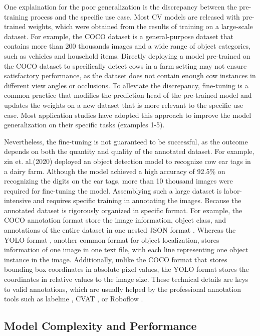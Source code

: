 One explaination for the poor generalization is the discrepancy between the pre-training process and the specific use case. Most CV models are released with pre-trained weights, which were obtained from the results of training on a large-scale dataset. For example, the COCO dataset \citep{} is a general-purpose dataset that contains more than 200 thousands images and a wide range of object categories, such as vehicles and household items. Directly deploying a model pre-trained on the COCO dataset to specifically detect cows in a farm setting may not ensure satisfactory performance, as the dataset does not contain enough cow instances in different view angles or occlusions. To alleviate the discrepancy, fine-tuning is a common practice that modifies the prediction head of the pre-trained model and updates the weights on a new dataset that is more relevant to the specific use case. Most application studies have adopted this approach to improve the model generalization on their specific tasks (examples 1-5).

Nevertheless, the fine-tuning is not guaranteed to be successful, as the outcome depends on both the quantity and quality of the annotated dataset. For example, zin et. al.(2020) deployed an object detection model to recognize cow ear tags in a dairy farm. Although the model achieved a high accuracy of 92.5\% on recognizing the digits on the ear tags, more than 10 thousand images were required for fine-tuning the model. Assemblying such a large dataset is labor-intensive and requires specific training in annotating the images. Because the annotated dataset is rigorously organized in specific format. For example, the COCO annotation format \citep{} store the image information, object class, and annotations of the entire dataset in one nested JSON format \citep{}. Whereas the YOLO format \citep{}, another common format for object localization, stores information of one image in one text file, with each line representing one object instance in the image. Additionally, unlike the COCO format that stores bounding box coordinates in absolute pixel values, the YOLO format stores the coordinates in relative values to the image size. These technical details are keys to valid annotations, which are usually helped by the professional annotation tools such as labelme \citep{}, CVAT \citep{}, or Roboflow \citep{}.

\subsection*{Model Complexity and Performance}

